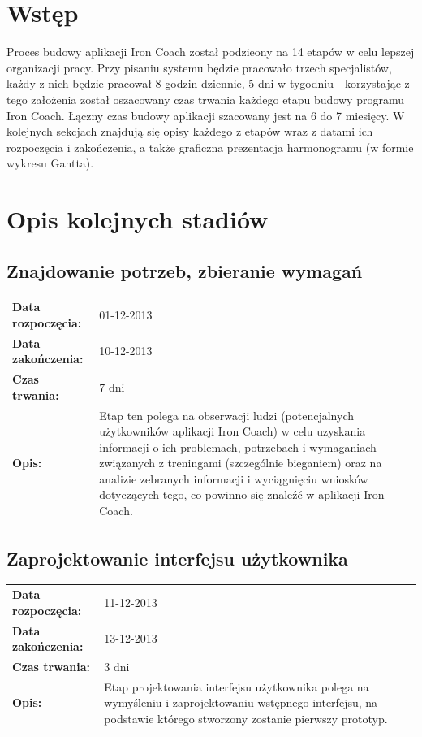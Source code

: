 

\tableofcontents
\clearpage
\renewcommand{\subsectionmark}[1]{}
\section{Wstęp}
	Proces budowy aplikacji Iron Coach został podzieony na 14 etapów w celu lepszej organizacji pracy. Przy pisaniu systemu będzie pracowało trzech specjalistów, każdy z nich będzie pracował 8 godzin dziennie, 5 dni w tygodniu - korzystając z tego założenia został oszacowany czas trwania każdego etapu budowy programu Iron Coach. Łączny czas budowy aplikacji szacowany jest na 6 do 7 miesięcy.
	W kolejnych sekcjach znajdują się opisy każdego z etapów wraz z datami ich rozpoczęcia i zakończenia, a także graficzna prezentacja harmonogramu (w formie wykresu Gantta).
\section{Opis kolejnych stadiów}
\subsection{Znajdowanie potrzeb, zbieranie wymagań}
	\begin{tabular}{l p{5cm}}
		\textbf{Data rozpoczęcia:} & 01-12-2013\\
		\textbf{Data zakończenia:} & 10-12-2013\\
		\textbf{Czas trwania:} & 7 dni\\
		\textbf{Opis:} & Etap ten polega na obserwacji ludzi (potencjalnych użytkowników aplikacji Iron Coach) w celu uzyskania informacji o ich problemach, potrzebach i wymaganiach związanych z treningami (szczególnie bieganiem) oraz na analizie zebranych informacji i wyciągnięciu wniosków dotyczących tego, co powinno się znaleźć w aplikacji Iron Coach.
	\end{tabular}
\subsection{Zaprojektowanie interfejsu użytkownika}
	\begin{tabular}{l p{5cm}}
		\textbf{Data rozpoczęcia:} & 11-12-2013\\
		\textbf{Data zakończenia:} & 13-12-2013\\
		\textbf{Czas trwania:} & 3 dni\\
		\textbf{Opis:} & Etap projektowania interfejsu użytkownika polega na wymyśleniu i zaprojektowaniu wstępnego interfejsu, na podstawie którego stworzony zostanie pierwszy prototyp.
	\end{tabular}
